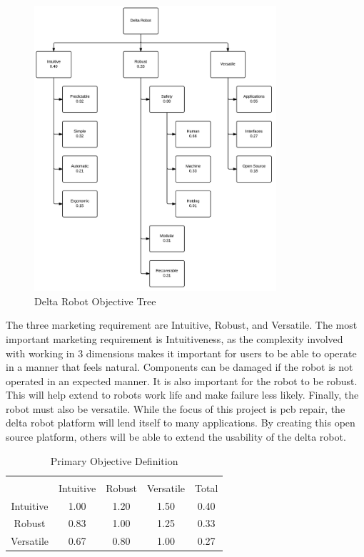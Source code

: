 \documentclass[11pt]{report}
\begin{document}
\begin{figure}[h]
	\centering
	\includegraphics[width=0.8\textwidth]{objectivetree.png}
	\caption{Delta Robot Objective Tree}
	\label{fig:objectivetree}
\end{figure}

The three marketing requirement are Intuitive, Robust, and Versatile.
The most important marketing requirement is Intuitiveness, as the complexity involved with working in 3 dimensions makes it important for users to be able to operate in a manner that feels natural.
Components can be damaged if the robot is not operated in an expected manner.
It is also important for the robot to be robust.
This will help extend to robots work life and make failure less likely.
Finally, the robot must also be versatile.
While the focus of this project is \gls{pcb} repair, the delta robot platform will lend itself to many applications.
By creating this open source platform, others will be able to extend the usability of the delta robot.

\begin{table}[ht] 
	\caption{Primary Objective Definition}
	\label{table:primary}
	\centering 
	\begin{tabular}{c c c c c} 
		\hline\hline \\
		 			& Intuitive 	& Robust 		& Versatile 	& Total\\ 
		Intuitive 	& 1.00 		& 1.20 		& 1.50 		& 0.40 \\ 
		Robust 		& 0.83 		& 1.00 		& 1.25		& 0.33 \\ 
		Versatile 	& 0.67 		& 0.80 		& 1.00 		& 0.27 \\ 
	\end{tabular} 
\end{table}
\end{document}
